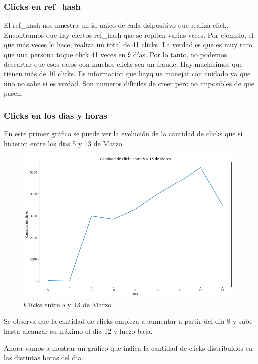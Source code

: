 \documentclass[a4paper, 12pt]{article}
\newcommand\tab[1][1cm]{\hspace*{#1}}
\begin{document}
	\subsubsection{Clicks en ref\_hash}
		\tab El ref\_hash nos muestra un id unico de cada dsipositivo que realiza click. Encontramos que hay ciertos ref\_hash que se repiten varias veces. Por ejemplo, el que más veces lo hace, realiza un total de 41 clicks. La verdad es que es muy raro que una persona toque click 41 veces en 9 días. Por lo tanto, no podemos descartar que esos casos con muchos clicks sea un fraude. Hay muchisimos que tienen más de 10 clicks. Es información que hayq ue manejar con cuidado ya que uno no sabe si es verdad. Son numeros difíciles de creer pero no imposibles de que pasen.


	\subsubsection{Clicks en los dias y horas}
		En este primer gráfico se puede ver la evolución de la cantidad de clicks que si hicieron entre los dias 5 y 13 de Marzo

		\FloatBarrier
		\begin{figure}[h]
			\centering
			\includegraphics[width=\textwidth]{images/clicks/clicks_days.png}
			\caption{Clicks entre 5 y 13 de Marzo}
		\end{figure}
		\FloatBarrier

		\tab Se observa que la cantidad de clicks empieza a aumentar a partir del dia 8 y sube hasta alcanzar su máximo el dia 12 y luego baja.

		\tab Ahora vamos a mostrar un gráfico que indica la cantidad de clicks distribuidos en las distintas horas del dia.
\end{document}
